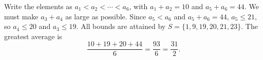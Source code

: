 Write the elements as $a_1<a_2<\cdots<a_6$, with $a_1+a_2=10$ and $a_5+a_6=44$. We must make $a_3+a_4$ as large as possible. Since $a_5<a_6$ and $a_5+a_6=44$, $a_5\le21$, so $a_4\le20$ and $a_3\le19$. All bounds are attained by $S=\{1,9,19,20,21,23\}$. The greatest average is
\[\dfrac{10+19+20+44}{6}=\dfrac{93}{6}=\boxed{\dfrac{31}{2}}.\]
